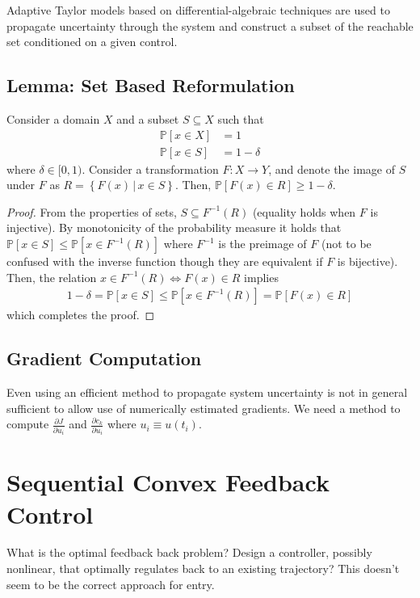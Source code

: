 \documentclass[letterpaper, preprint, paper,11pt]{AAS}	%
\begin{document}
	Adaptive Taylor models based on differential-algebraic techniques are used to propagate uncertainty through the system and construct a subset of the reachable set conditioned on a given control. 
	
	\subsection{Lemma: Set Based Reformulation}
	Consider a domain $X$ and a subset $S \subseteq X$ such that 
		\begin{align}
		\mathbb{P}[x\in X] &= 1 \\
		\mathbb{P}[x\in S] &= 1-\delta
		\end{align}
		where $\delta \in [0,1)$.
	Consider a transformation $F\colon X\to Y$, and denote the image of $S$ under $F$ as $R = \left\lbrace F(x)\,|\,x\in S \right\rbrace$. Then, $\mathbb{P}[F(x)\in R] \ge 1-\delta$.
	
	\begin{proof}
		From the properties of sets, $S\subseteq F^{-1}(R)$ (equality holds when $ F $ is injective). By monotonicity of the probability measure it holds that $\mathbb{P}[x\in S] \leq \mathbb{P}[x\in F^{-1}(R)]$ where $F^{-1}$ is the preimage of $ F $ (not to be confused with the inverse function though they are equivalent if $F$ is bijective). Then, the relation $x\in F^{-1}(R) \Leftrightarrow F(x)\in R$ implies
		\begin{align*}
		1-\delta = \mathbb{P}[x\in S] \le \mathbb{P}[x\in F^{-1}(R)] = \mathbb{P}[F(x)\in R] 
		\end{align*}
		which completes the proof.
	\end{proof}

	
	
	\subsection{Gradient Computation}
	Even using an efficient method to propagate system uncertainty is not in general sufficient to allow use of numerically estimated gradients.	We need a method to compute $ \frac{\partial J}{\partial u_i} $ and $ \frac{\partial c_k}{\partial u_i} $ where $u_i \equiv u(t_i)$.
		
		
		
		
	\section{Sequential Convex Feedback Control}
	What is the optimal feedback back problem? Design a controller, possibly nonlinear, that optimally regulates back to an existing trajectory? This doesn't seem to be the correct approach for entry. 
	
\end{document}
